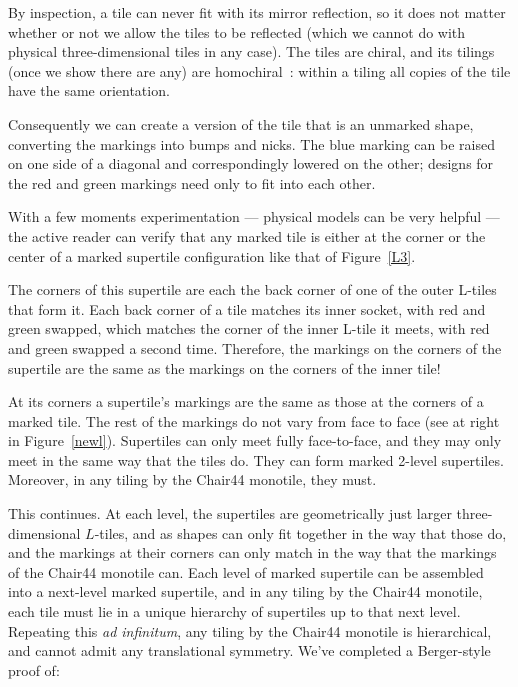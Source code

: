 \documentclass[11pt, oneside]{article}
\begin{document}
By inspection, a tile can never fit with its mirror reflection, so it does not matter whether or not we allow the tiles to be reflected (which we cannot do with physical three-dimensional tiles in any case).  The tiles are chiral, and its tilings (once we show there are any) are homochiral~\cite{spectre}: within a tiling  all copies of the tile have the same orientation.   

Consequently we can create a version of the tile that is an unmarked shape, converting the markings into bumps and nicks. The blue marking can be raised on one side of a diagonal and correspondingly lowered on the other;  designs for the red and green markings need only to fit into each other. 

With a few moments experimentation --- physical models can be very helpful --- the active reader can verify that any marked tile is either at the corner or the center of a marked supertile configuration like that of Figure~\ref{L3}. 


The corners of this supertile are each the back corner of one of the outer L-tiles that form it. Each back corner of a tile matches its inner socket, with red and green swapped, which matches the corner of the inner L-tile it meets, with red and green swapped a second time. 
Therefore,  the markings on the  corners of the supertile are the same as the markings on the  corners of the inner tile! 

At its corners a supertile's markings are the same as  those at the corners of a marked tile.  
The rest of the markings do not vary from face to face (see at right in Figure~\ref{newl}). Supertiles can only meet fully face-to-face, and they may only meet in the same way that the tiles do. They can form marked 2-level supertiles. Moreover, in any tiling by the Chair44 monotile, they must. 

This continues. At each level, the supertiles are geometrically just larger three-dimensional $L$-tiles, and as shapes can only fit together in the way that those do, and the markings at their corners can only match in the way that the markings of the Chair44 monotile can. Each level of marked supertile can be assembled into a next-level marked supertile, and in any tiling by the Chair44 monotile, each tile must lie in a unique hierarchy of supertiles up to that next level. Repeating this {\em ad infinitum}, any tiling by the Chair44 monotile is hierarchical, and cannot admit any translational symmetry. We've completed a  Berger-style proof of:
\end{document}
